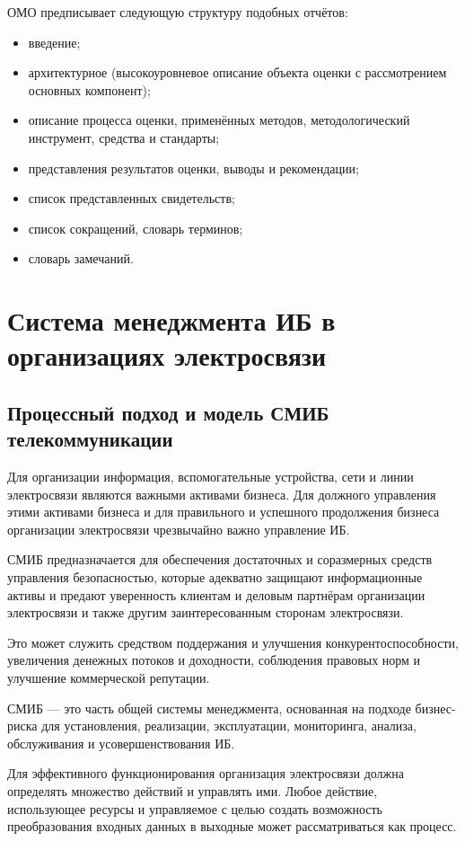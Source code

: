 \documentclass[12pt, russian, oneside, article]{ncc}
\begin{document}
ОМО предписывает следующую структуру подобных отчётов:
\begin{itemize}
\item введение;
\item архитектурное (высокоуровневое описание объекта оценки с рассмотрением основных компонент);
\item описание процесса оценки, применённых методов, методологический инструмент, средства и стандарты;
\item представления результатов оценки, выводы и рекомендации;
\item список представленных свидетельств;
\item список сокращений, словарь терминов;
\item словарь замечаний.
\end{itemize}
\section{Система менеджмента ИБ в организациях электросвязи}
\label{sec-4}
\subsection{Процессный подход и модель СМИБ телекоммуникации}
\label{sec-4_1}


Для организации информация, вспомогательные устройства, сети и линии электросвязи являются важными активами бизнеса. Для должного управления этими активами бизнеса и для правильного и успешного продолжения бизнеса организации электросвязи чрезвычайно важно управление ИБ.

СМИБ предназначается для обеспечения достаточных и соразмерных средств управления безопасностью, которые адекватно защищают информационные активы и предают уверенность клиентам и деловым партнёрам организации электросвязи и также другим заинтересованным сторонам электросвязи.

Это может служить средством поддержания и улучшения конкурентоспособности, увеличения денежных потоков и доходности, соблюдения правовых норм и улучшение коммерческой репутации.

СМИБ --- это часть общей системы менеджмента, основанная на подходе бизнес-риска для установления, реализации, эксплуатации, мониторинга, анализа, обслуживания и усовершенствования ИБ.

Для эффективного функционирования организация электросвязи должна определять множество действий и управлять ими. Любое действие, использующее ресурсы и управляемое с целью создать возможность преобразования входных данных в выходные может рассматриваться как процесс.
\end{document}
